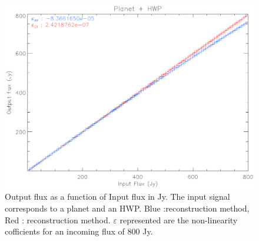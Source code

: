 \begin{figure}[h]
\center
	\includegraphics[scale=0.55]{Figures/nl-planet-hwp.eps}
	\caption{Output flux as a function of Input flux in Jy. The input signal corresponds to a planet and an HWP. Blue :\rf reconstruction method, Red : \cf reconstruction method. $\varepsilon$  represented are the non-linearity cofficients for an incoming flux of 800 Jy.}
	\label{fig:nl-planet-hwp}
\end{figure}

